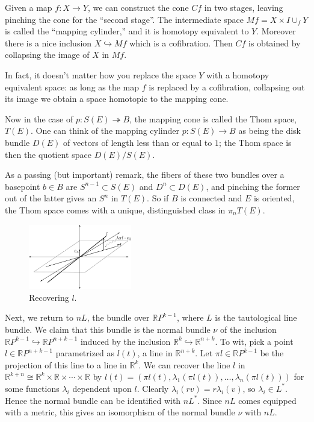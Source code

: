 \documentclass{article}
\newcommand{\R}{\mathbb{R}}
\newcommand{\RP}{\R P}
\newcommand{\into}{\hookrightarrow}
\newcommand{\onto}{\twoheadrightarrow}
\renewcommand{\to}{\longrightarrow}
\theoremstyle{definition}
\begin{document}
Given a map $f:X\to Y$, we can construct the cone $Cf$ in two stages, leaving pinching the cone for the ``second stage''. The intermediate space $Mf=X\times I\cup_f Y$ is called the ``mapping cylinder,'' and it is homotopy equivalent to $Y$.  Moreover there is a nice inclusion $X \into Mf$ which is a cofibration. Then $Cf$ is obtained by collapsing the image of $X$ in $Mf$.

In fact, it doesn't matter how you replace the space $Y$ with a homotopy equivalent space: as long as the map $f$ is replaced by a cofibration, collapsing out its image we obtain a space homotopic to the mapping cone.

Now in the case of $p: S(E) \onto B$, the mapping cone is called the Thom space, $T(E)$. 
One can think of the mapping cylinder $p:S(E)\to B$ as being the disk bundle $D(E)$ of vectors of length less than or equal to $1$; the Thom space is then the quotient space $D(E) / S(E)$. 

As a passing (but important) remark, the fibers of these two bundles over a basepoint $b \in B$ are $S^{n-1} \subset S(E)$ and $D^n \subset D(E)$, and pinching the former out of the latter gives an $S^n$ in $T(E)$.  So if $B$ is connected and $E$ is oriented, the Thom space comes with a unique, distinguished class in $\pi_n T(E)$.

\begin{figure}
\centering\includegraphics[width=0.4\textwidth]{figures/fig8.pdf}
\caption{\small Recovering $l$.}
\end{figure} %
Next, we return to $nL$, the bundle over $\RP^{k-1}$, where $L$ is the tautological line bundle.  We claim that this bundle is the normal bundle $\nu$ of the inclusion $\RP^{k-1} \into \RP^{n+k-1}$ induced by the inclusion $\R^k \into \R^{n+k}$.  To wit, pick a point $l \in \RP^{n+k-1}$ parametrized as $l(t)$, a line in $\R^{n+k}$.  Let $\pi l \in \RP^{k-1}$ be the projection of this line to a line in $\R^k$.  We can recover the line $l$ in $\R^{k+n} \cong \R^k \times \R \times \cdots \times \R$ by $l(t) = (\pi l(t), \lambda_1(\pi l(t)), \ldots, \lambda_n(\pi l(t)))$ for some functions $\lambda_i$ dependent upon $l$.  Clearly $\lambda_i(rv) = r \lambda_i(v)$, so $\lambda_i \in L^*$.  Hence the normal bundle can be identified with $nL^*$.  Since $nL$ comes equipped with a metric, this gives an isomorphism of the normal bundle $\nu$ with $nL$.
\end{document}
